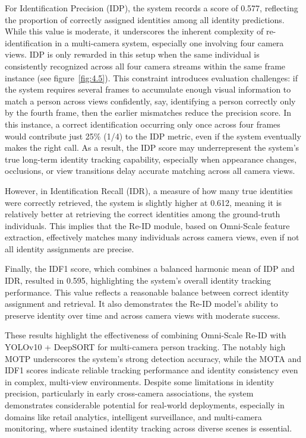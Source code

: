 {For Identification Precision (IDP), the system records a score of 0.577, reflecting the proportion of correctly assigned identities among all identity predictions. While this value is moderate, it underscores the inherent complexity of re-identification in a multi-camera system, especially one involving four camera views. IDP is only rewarded in this setup when the same individual is consistently recognized across all four camera streams within the same frame instance (see figure~\ref{fig:4.5}). This constraint introduces evaluation challenges: if the system requires several frames to accumulate enough visual information to match a person across views confidently, say, identifying a person correctly only by the fourth frame, then the earlier mismatches reduce the precision score. In this instance, a correct identification occurring only once across four frames would contribute just 25\% (1/4) to the IDP metric, even if the system eventually makes the right call. As a result, the IDP score may underrepresent the system’s true long-term identity tracking capability, especially when appearance changes, occlusions, or view transitions delay accurate matching across all camera views.

However, in Identification Recall (IDR), a measure of how many true identities were correctly retrieved, the system is slightly higher at 0.612, meaning it is relatively better at retrieving the correct identities among the ground-truth individuals. This implies that the Re-ID module, based on Omni-Scale feature extraction, effectively matches many individuals across camera views, even if not all identity assignments are precise.

Finally, the IDF1 score, which combines a balanced harmonic mean of IDP and IDR, resulted in 0.595, highlighting the system’s overall identity tracking performance. This value reflects a reasonable balance between correct identity assignment and retrieval. It also demonstrates the Re-ID model’s ability to preserve identity over time and across camera views with moderate success.

These results highlight the effectiveness of combining Omni-Scale Re-ID with YOLOv10 + DeepSORT for multi-camera person tracking. The notably high MOTP underscores the system’s strong detection accuracy, while the MOTA and IDF1 scores indicate reliable tracking performance and identity consistency even in complex, multi-view environments. Despite some limitations in identity precision, particularly in early cross-camera associations, the system demonstrates considerable potential for real-world deployments, especially in domains like retail analytics, intelligent surveillance, and multi-camera monitoring, where sustained identity tracking across diverse scenes is essential.

}
